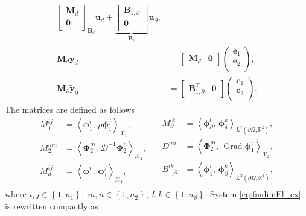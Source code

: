 \documentclass{svjour3}                     %
\DeclareMathOperator*{\Grad}{Grad}
\newcommand{\inner}[3][]{\ensuremath{\left\langle #2, \, #3 \right\rangle_{#1}}}
\begin{document}
{\begin{equation}
\begin{aligned}
{\begin{bmatrix}
			\mathbf{M}_{d}\\
			\mathbf{0}\\
			\end{bmatrix}}_{\mathbf{B}_d}
		\mathbf{u}_d
		+ 
		\underbrace{\begin{bmatrix}
			\mathbf{B}_{1, \partial}\\
			\mathbf{0}\\
			\end{bmatrix}}_{\mathbf{B}_\partial}
		\mathbf{u}_\partial, \\
		\mathbf{M}_{d} \widetilde{\mathbf{y}}_d &= \begin{bmatrix}
		\mathbf{M}_{d} & \mathbf{0}
		\end{bmatrix} \begin{pmatrix}
		\mathbf{e}_{1} \\
		\mathbf{e}_{2} \\
		\end{pmatrix},  \\
		\mathbf{M}_\partial \widetilde{\mathbf{y}}_\partial &= \begin{bmatrix}
		\mathbf{B}_{1, \partial}^\top & \mathbf{0}
		\end{bmatrix} \begin{pmatrix}
		\mathbf{e}_{1} \\
		\mathbf{e}_{2} \\
		\end{pmatrix}.
		\end{aligned}
		\end{equation}
		The matrices are defined as follows 
		\begin{equation}\label{eq:matrices}
		\begin{aligned}
		M_1^{ij} &= \inner[\mathscr{X}_1]{\bm\phi_1^i}{\rho \bm\phi_1^j}, \\
		M_2^{mn} &= \inner[\mathscr{X}_2]{\bm\Phi_2^m}{\bm{\mathcal{D}}^{-1}\bm\Phi_2^n}, \\
		M_d^{ij} &= \inner[\mathscr{X}_1]{\bm\phi_1^i}{\bm\phi_1^j}, \\
		\end{aligned}\quad
		\begin{aligned}
		M_\partial^{lk} &= \inner[L^2(\partial \Omega, \mathbb{R}^3)]{\bm\phi_\partial^l}{\bm\phi_\delta^k}, \\
		{D}^{mi} &= \inner[\mathscr{X}_2]{\bm\Phi_2^m}{\Grad\bm\phi_1^i}, \\
		{B}_{1, \partial}^{ik} &= \inner[\mathscr{L}^2(\partial \Omega, \mathbb{R}^3)]{\bm\phi_1^i}{\bm\phi_\partial^k}, \\
		\end{aligned}
		\end{equation}
		where $i, j \in \left\{1, n_1\right\}, \; m,n \in \left\{1, n_2\right\}, \; l, k \in \left\{1, n_\partial \right\}$. System \eqref{eq:findimEl_ex} is rewritten compactly as
	}
\end{document}
